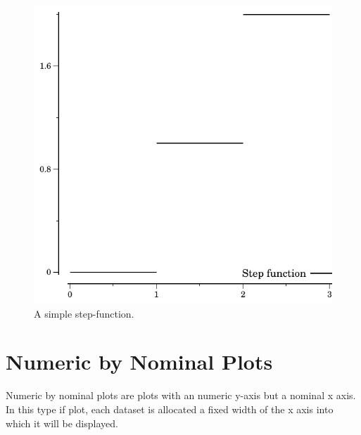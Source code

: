 \documentclass{article}
\begin{document}
\begin{figure}[t]
\begin{center}
\includegraphics{step_func}
\caption{\label{fig:step}A simple step-function.}
\end{center}
\end{figure}

\section{Numeric by Nominal Plots}

Numeric by nominal plots are plots with an numeric y-axis but a
nominal x axis.  In this type if plot, each dataset is allocated a
fixed width of the x axis into which it will be displayed.
\end{document}
